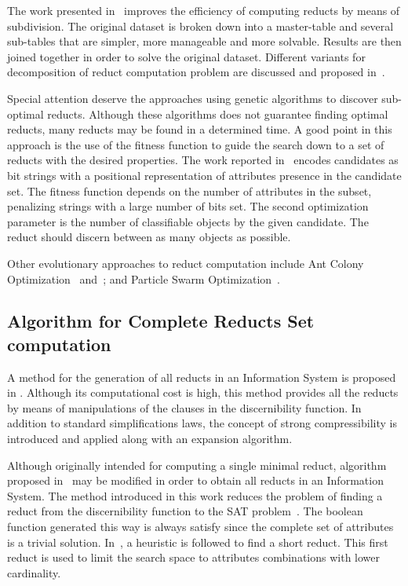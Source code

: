 \documentclass[11pt]{article}   %
\begin{document}
  The work presented in~\cite{Jiao10} improves the efficiency of computing reducts by means of subdivision. The 
  original dataset is broken down into a master-table and several sub-tables that are simpler, more manageable 
  and more solvable. Results are then joined together in order to solve the original dataset. Different variants
  for decomposition of reduct computation problem are discussed and proposed in~\cite{Strakowski08}.
  
  Special attention deserve the approaches using genetic algorithms to discover sub-optimal reducts. Although 
  these algorithms does not guarantee finding optimal reducts, many reducts may be found in a determined time.
  A good point in this approach is the use of the fitness function to guide the search down to a set of 
  reducts with the desired properties. The work reported in~\cite{Wroblewski95} encodes candidates as bit 
  strings with a positional representation of attributes presence in the candidate set. The fitness function
  depends on the number of attributes in the subset, penalizing strings with a large number of bits set. The 
  second optimization parameter is the number of classifiable objects by the given candidate. The reduct should 
  discern between as many objects as possible.
  
  Other evolutionary approaches to reduct computation include Ant Colony Optimization~\cite{Jensen03}
  and~\cite{Chen10}; and Particle Swarm Optimization~\cite{Wang07}.
    
\subsection{Algorithm for Complete Reducts Set computation}
  A method for the generation of all reducts in an Information System is proposed in \cite{Starzyk99,Starzyk00}.
  Although its computational cost is high, this method provides all the reducts by means of manipulations of 
  the clauses in the discernibility function. In addition to standard simplifications laws, the concept of 
  strong compressibility is introduced and applied along with an expansion algorithm.
  
  Although originally intended for computing a single minimal reduct, algorithm proposed in~\cite{Jensen14} may be
  modified in order to obtain all reducts in an Information System. The method introduced in this work reduces
  the problem of finding a reduct from the discernibility function to the SAT problem~\cite{Davis62}. The boolean
  function generated this way is always satisfy since the complete set of attributes is a trivial solution.
  In~\cite{Lin04}, a heuristic is followed to find a short reduct. This first reduct is used to limit the search
  space to attributes combinations with lower cardinality.
  
\end{document}
